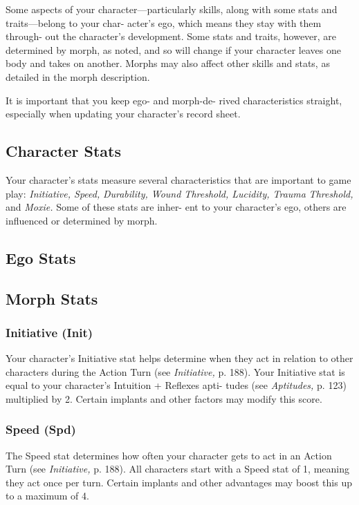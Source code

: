 Some aspects of your character—particularly skills, 
along with some stats and traits—belong to your char-
acter's ego, which means they stay with them through-
out the character's development. Some stats and traits, 
however, are determined by morph, as noted, and so 
will change if your character leaves one body and 
takes on another. Morphs may also affect other skills 
and stats, as detailed in the morph description.

It is important that you keep ego- and morph-de-
rived characteristics straight, especially when updating 
your character's record sheet.

\subsection{Character Stats}

Your character's stats measure several characteristics 
that are important to game play: \textit{Initiative, Speed, }
\textit{Durability, Wound Threshold, Lucidity, Trauma }
\textit{Threshold,} and \textit{Moxie.} Some of these stats are inher-
ent to your character's ego, others are influenced or 
determined by morph.

\subsection{Ego Stats}


\subsection{Morph Stats}


\subsubsection{Initiative (Init)}

Your character's Initiative stat helps determine when 
they act in relation to other characters during the 
Action Turn (see \textit{Initiative,} p. 188). Your Initiative stat 
is equal to your character's Intuition + Reflexes apti-
tudes (see \textit{Aptitudes,} p. 123) multiplied by 2. Certain 
implants and other factors may modify this score.

\subsubsection{Speed (Spd)}

The Speed stat determines how often your character 
gets to act in an Action Turn (see \textit{Initiative,} p. 188). 
All characters start with a Speed stat of 1, meaning 
they act once per turn. Certain implants and other 
advantages may boost this up to a maximum of 4.

